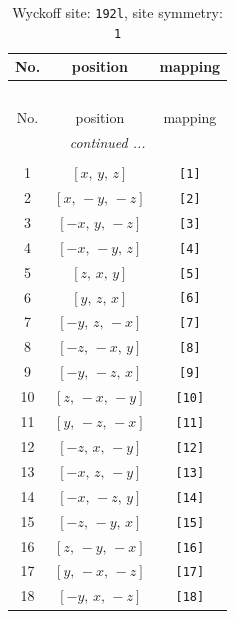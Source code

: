 \documentclass[fleqn,8pt]{jsarticle}
\begin{document}
\begin{longtable}{ccc}
\caption{Wyckoff site: {\tt 192l}, site symmetry: {\tt 1}}
 \\
 \hline \hline
No. & position & mapping \\ \hline \endfirsthead

\multicolumn{2}{l}{\tablename\ \thetable{}} \\
 \hline \hline
No. & position & mapping \\ \hline \endhead

 \hline \hline
\multicolumn{2}{r}{\footnotesize\it continued ...} \\ \endfoot

 \hline \hline
\multicolumn{2}{r}{} \\ \endlastfoot

1 & $\left[ x,\, y,\, z \right]$ & {\tt [1]} \\ \hline
2 & $\left[ x,\, - y,\, - z \right]$ & {\tt [2]} \\ \hline
3 & $\left[ - x,\, y,\, - z \right]$ & {\tt [3]} \\ \hline
4 & $\left[ - x,\, - y,\, z \right]$ & {\tt [4]} \\ \hline
5 & $\left[ z,\, x,\, y \right]$ & {\tt [5]} \\ \hline
6 & $\left[ y,\, z,\, x \right]$ & {\tt [6]} \\ \hline
7 & $\left[ - y,\, z,\, - x \right]$ & {\tt [7]} \\ \hline
8 & $\left[ - z,\, - x,\, y \right]$ & {\tt [8]} \\ \hline
9 & $\left[ - y,\, - z,\, x \right]$ & {\tt [9]} \\ \hline
10 & $\left[ z,\, - x,\, - y \right]$ & {\tt [10]} \\ \hline
11 & $\left[ y,\, - z,\, - x \right]$ & {\tt [11]} \\ \hline
12 & $\left[ - z,\, x,\, - y \right]$ & {\tt [12]} \\ \hline
13 & $\left[ - x,\, z,\, - y \right]$ & {\tt [13]} \\ \hline
14 & $\left[ - x,\, - z,\, y \right]$ & {\tt [14]} \\ \hline
15 & $\left[ - z,\, - y,\, x \right]$ & {\tt [15]} \\ \hline
16 & $\left[ z,\, - y,\, - x \right]$ & {\tt [16]} \\ \hline
17 & $\left[ y,\, - x,\, - z \right]$ & {\tt [17]} \\ \hline
18 & $\left[ - y,\, x,\, - z \right]$ & {\tt [18]} \\ \hline

\end{longtable}
\end{document}
